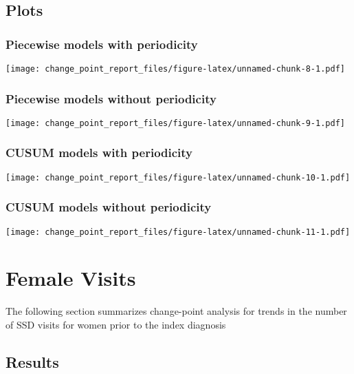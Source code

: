 \documentclass[
]{article}
\begin{document}
\hypertarget{plots}{%
\subsection{Plots}\label{plots}}

\hypertarget{piecewise-models-with-periodicity}{%
\subsubsection{Piecewise models with
periodicity}\label{piecewise-models-with-periodicity}}

\texttt{[image: change\_point\_report\_files/figure-latex/unnamed-chunk-8-1.pdf]}

\hypertarget{piecewise-models-without-periodicity}{%
\subsubsection{Piecewise models without
periodicity}\label{piecewise-models-without-periodicity}}

\texttt{[image: change\_point\_report\_files/figure-latex/unnamed-chunk-9-1.pdf]}

\hypertarget{cusum-models-with-periodicity}{%
\subsubsection{CUSUM models with
periodicity}\label{cusum-models-with-periodicity}}

\texttt{[image: change\_point\_report\_files/figure-latex/unnamed-chunk-10-1.pdf]}

\hypertarget{cusum-models-without-periodicity}{%
\subsubsection{CUSUM models without
periodicity}\label{cusum-models-without-periodicity}}

\texttt{[image: change\_point\_report\_files/figure-latex/unnamed-chunk-11-1.pdf]}

\hypertarget{female-visits}{%
\section{Female Visits}\label{female-visits}}

The following section summarizes change-point analysis for trends in the
number of SSD visits for women prior to the index diagnosis

\hypertarget{results-1}{%
\subsection{Results}\label{results-1}}
\end{document}
